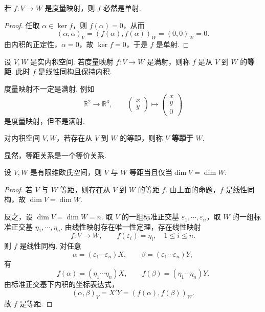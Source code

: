 \begin{proposition}
	若 $f:V\longrightarrow W$ 是度量映射，则 $f$ 必然是单射.
\end{proposition}
\begin{proof}
	任取 $\alpha\in\ker f$，则 $f(\alpha)=0$，从而
	\[
	(\alpha,\alpha)_V=(f(\alpha),f(\alpha))_W=(0,0)_W=0.
	\]
	由内积的正定性，$\alpha=0$，故 $\ker f=0$，于是 $f$ 是单射.
\end{proof}

\begin{definition}\label{p1:concept:c6-l516}
	设 $V,W$ 是实内积空间. 若度量映射 $f:V\longrightarrow W$ 是满射，则称 $f$ 是从 $V$ 到 $W$ 的\textbf{等距}. 此时 $f$ 是线性同构且保持内积.
\end{definition}


度量映射不一定是满射. 例如
\[
\mathbb{R}^2\longrightarrow \mathbb{R}^3,
\qquad
\begin{pmatrix}x\\ y\end{pmatrix}
\longmapsto
\begin{pmatrix}x\\ y\\ 0\end{pmatrix}
\]
是度量映射，但不是满射.

\begin{definition}\label{p1:concept:c6-l531}
	对内积空间 $V,W$，若存在从 $V$ 到 $W$ 的等距，则称 $V$ \textbf{等距于} $W$.
\end{definition}
	显然，等距关系是一个等价关系.


\begin{theorem}
	设 $V,W$ 是有限维欧氏空间，则 $V$ 与 $W$ 等距当且仅当$\dim V=\dim W.$
	
\end{theorem}
\begin{proof}
	若 $V$ 与 $W$ 等距，则存在从 $V$ 到 $W$ 的等距 $f$. 由上面的命题，$f$ 是线性同构，故 $\dim V=\dim W$.
	
	反之，设 $\dim V=\dim W=n$. 取 $V$ 的一组标准正交基 $\varepsilon_1,\cdots,\varepsilon_n$，取 $W$ 的一组标准正交基 $\eta_1,\cdots,\eta_n$. 由线性映射存在唯一性定理，存在线性映射
	\[
	f:V\longrightarrow W,
	\qquad
	f(\varepsilon_i)=\eta_i,
	\quad 1\leqslant i\leqslant n.
	\]
	则 $f$ 是线性同构. 对任意
	\[
	\alpha=(\varepsilon_1\cdots\varepsilon_n)X,
	\qquad
	\beta=(\varepsilon_1\cdots\varepsilon_n)Y,
	\]
	有
	\[
	f(\alpha)=(\eta_1\cdots\eta_n)X,
	\qquad
	f(\beta)=(\eta_1\cdots\eta_n)Y.
	\]
	由标准正交基下内积的坐标表达式，
	\[
	(\alpha,\beta)_V=X'Y=(f(\alpha),f(\beta))_W.
	\]
	故 $f$ 是等距.
\end{proof}



